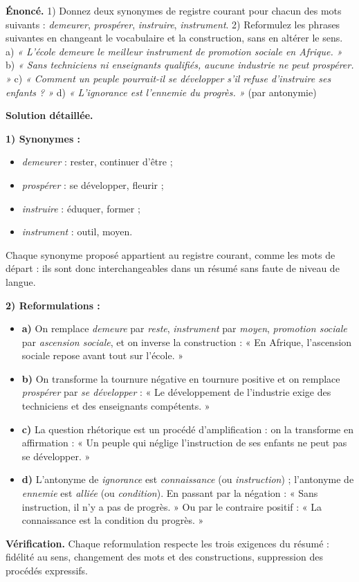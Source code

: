 \documentclass[11pt]{article}
\begin{document}
\begin{exoresolu}
\textbf{Énoncé.}
1) Donnez deux synonymes de registre courant pour chacun des mots suivants : \emph{demeurer}, \emph{prospérer}, \emph{instruire}, \emph{instrument}.
2) Reformulez les phrases suivantes en changeant le vocabulaire et la construction, sans en altérer le sens.
a) \emph{« L'école demeure le meilleur instrument de promotion sociale en Afrique. »}
b) \emph{« Sans techniciens ni enseignants qualifiés, aucune industrie ne peut prospérer. »}
c) \emph{« Comment un peuple pourrait-il se développer s'il refuse d'instruire ses enfants ? »}
d) \emph{« L'ignorance est l'ennemie du progrès. »} (par antonymie)

\tcblower
\textbf{Solution détaillée.}

\textbf{1) Synonymes :}
\begin{itemize}
\item \emph{demeurer} : rester, continuer d'être ;
\item \emph{prospérer} : se développer, fleurir ;
\item \emph{instruire} : éduquer, former ;
\item \emph{instrument} : outil, moyen.
\end{itemize}
Chaque synonyme proposé appartient au registre courant, comme les mots de départ : ils sont donc interchangeables dans un résumé sans faute de niveau de langue.

\textbf{2) Reformulations :}
\begin{itemize}
\item \textbf{a)} On remplace \emph{demeure} par \emph{reste}, \emph{instrument} par \emph{moyen}, \emph{promotion sociale} par \emph{ascension sociale}, et on inverse la construction : « En Afrique, l'ascension sociale repose avant tout sur l'école. »
\item \textbf{b)} On transforme la tournure négative en tournure positive et on remplace \emph{prospérer} par \emph{se développer} : « Le développement de l'industrie exige des techniciens et des enseignants compétents. »
\item \textbf{c)} La question rhétorique est un procédé d'amplification : on la transforme en affirmation : « Un peuple qui néglige l'instruction de ses enfants ne peut pas se développer. »
\item \textbf{d)} L'antonyme de \emph{ignorance} est \emph{connaissance} (ou \emph{instruction}) ; l'antonyme de \emph{ennemie} est \emph{alliée} (ou \emph{condition}). En passant par la négation : « Sans instruction, il n'y a pas de progrès. » Ou par le contraire positif : « La connaissance est la condition du progrès. »
\end{itemize}
\textbf{Vérification.} Chaque reformulation respecte les trois exigences du résumé : fidélité au sens, changement des mots et des constructions, suppression des procédés expressifs.
\end{exoresolu}
\end{document}
